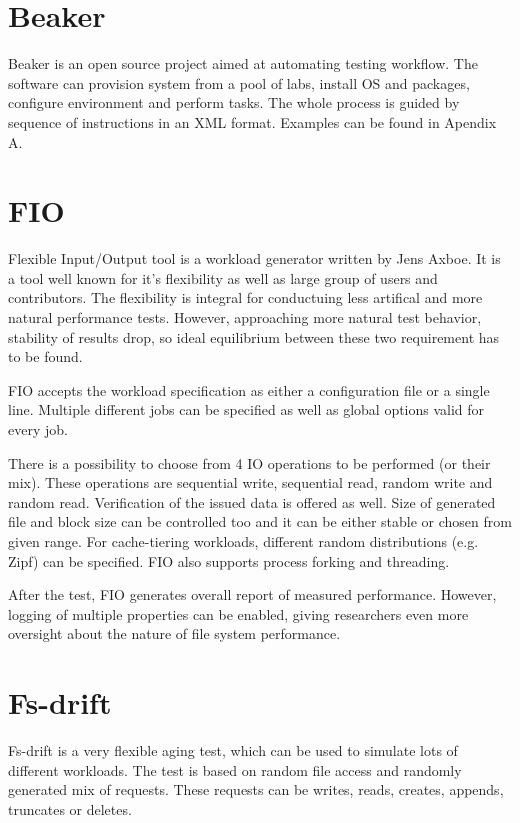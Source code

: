 \documentclass[
  color, %
  table, %
  lof,   %
  lot,   %
]{fithesis3}
\begin{document}
\section{Beaker}
Beaker is an open source project aimed at automating testing workflow. The software can provision system from a pool of labs, install OS and packages, configure environment and perform tasks. The whole process is guided by sequence of instructions in an XML format. Examples can be found in Apendix A.





\section{FIO}
Flexible Input/Output tool is a workload generator written by Jens Axboe. It is a tool well known for it's flexibility as well as large group of users and contributors. The flexibility is integral for conductuing less artifical and more natural performance tests. However, approaching more natural test behavior, stability of results drop, so ideal equilibrium between these two requirement has to be found.

FIO accepts the workload specification as either a configuration file or a single line. Multiple different jobs can be specified as well as global options valid for every job. 


There is a possibility to choose from 4 IO operations to be performed (or their mix). These operations are sequential write, sequential read, random write and random read. Verification of the issued data is offered as well. Size of generated file and block size can be controlled too and it can be either stable or chosen from given range. For cache-tiering workloads, different random distributions (e.g. Zipf) can be specified. FIO also supports process forking and threading.

After the test, FIO generates overall report of measured performance. However, logging of multiple properties can be enabled, giving researchers even more oversight about the nature of file system performance.

\section{Fs-drift}
Fs-drift is a very flexible aging test, which can be used to simulate lots of different workloads. The test is based on random file access and randomly generated mix of requests. These requests can be writes, reads, creates, appends, truncates or deletes.
\end{document}
